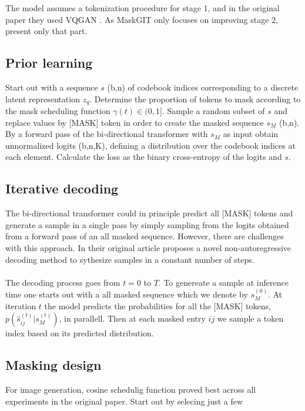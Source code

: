 \documentclass[../../thesis.tex]{subfiles}
\begin{document}
The model assumes a tokenization procedure for stage 1, and in the original paper they used VQGAN \cite{VQGAN}. As MaskGIT only focuses on improving stage 2, present only that part. 

\subsection{Prior learning}

Start out with a sequence $s$ (b,n) of codebook indices corresponding to a discrete latent representation $z_q$. Determine the proportion of tokens to mask according to the mask scheduling function $\gamma(t)\in (0,1]$. 
Sample a random subset of $s$ and replace values by [MASK] token in order to create the masked sequence $s_M$ (b,n). By a forward pass of the bi-directional transformer with $s_M$ as input obtain unnormalized logits (b,n,K), defining a distribution over the codebook indices at each element. Calculate the loss as the binary cross-entropy of the logits and $s$. 

\subsection{Iterative decoding}

The bi-directional transformer could in principle predict all [MASK] tokens and generate a sample in a single pass by simply sampling from the logits obtained from a forward pass of an all masked sequence. However, there are challenges with this approach. In their original article  \cite{chang2022maskgit} proposes a novel non-autoregressive decoding method to sythesize samples in a constant number of steps.\\\\

The decoding process goes from $t = 0$ to $T$. To genereate a sample at inference time one starts out with a all masked sequence which we denote by $s_M^{(0)}$. At iteration $t$ the model predicts the probabilities for all the [MASK] tokens, $p(\hat{s}_{ij}^{(t)}|s_M^{(t)})$, in parallell. Then at each masked entry $ij$ we sample a token index based on its predicted distribution.  

\subsection{Masking design}

For image generation, cosine schedulig function proved best across all experiments in the original paper. Start out by selecing just a few 
\end{document}
